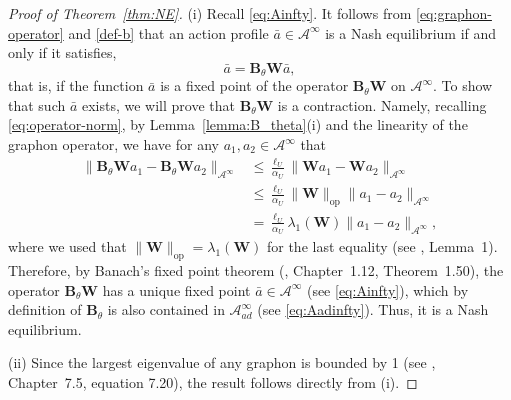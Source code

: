 \documentclass[11pt]{article}
\newcommand{\be}{\begin{equation}}
\newcommand{\ee}{\end{equation}}
\numberwithin{equation}{section}
\begin{document}
\begin{proof}[Proof of Theorem~\ref{thm:NE}]
(i) Recall \eqref{eq:Ainfty}. It follows from \eqref{eq:graphon-operator} and \eqref{def-b} that an action profile $\bar{a}\in\mathcal{A}^\infty$ is a Nash equilibrium if and only if it satisfies,
$$
\bar{a}=\boldsymbol{B}_\theta \boldsymbol{W}\bar{a},
$$
that is, if the function $\bar{a}$ is a fixed point of the operator  $\boldsymbol{B}_\theta \boldsymbol{W}$ on $\mathcal{A}^\infty$. To show that such $\bar a$ exists, we will prove that $\boldsymbol{B}_\theta \boldsymbol{W}$ is a contraction. Namely, recalling \eqref{eq:operator-norm}, by Lemma~\ref{lemma:B_theta}(i) and the linearity of the graphon operator, we have for any $a_1,a_2\in \mathcal{A}^\infty$ that
\be\begin{aligned}
    \|\boldsymbol{B}_\theta \boldsymbol{W}a_1-\boldsymbol{B}_\theta \boldsymbol{W}a_2\|_{\mathcal{A}^\infty}&\leq \frac{\ell_U}{\alpha_U}\| \boldsymbol{W}a_1- \boldsymbol{W}a_2\|_{\mathcal{A}^\infty}\\
    &\leq \frac{\ell_U}{\alpha_U}\|\boldsymbol{W}\|_{\operatorname{op}}\| a_1- a_2\|_{\mathcal{A}^\infty}\\
    &=\frac{\ell_U}{\alpha_U}\lambda_{1}(\boldsymbol{W})\| a_1- a_2\|_{\mathcal{A}^\infty},
\end{aligned}\ee
where we used that $\|\boldsymbol{W}\|_{\operatorname{op}}=\lambda_{1}(\boldsymbol{W})$ for the last equality (see \cite{avella2018centrality}, Lemma~1).
Therefore, by Banach's fixed point theorem (\cite{bauschke2017}, Chapter~1.12, Theorem~1.50), the operator  $\boldsymbol{B}_\theta \boldsymbol{W}$ has a unique fixed point $\bar a\in\mathcal{A}^\infty$ (see \eqref{eq:Ainfty}), which by definition of $\boldsymbol{B}_\theta$ is also contained in $\mathcal{A}_{ad}^\infty$ (see \eqref{eq:Aadinfty}).  Thus, it is a Nash equilibrium. 

(ii) Since the largest eigenvalue of any graphon is bounded by 1 (see \cite{lovasz2012large}, Chapter~7.5, equation 7.20), the result follows directly from (i). 
\end{proof}
\end{document}
